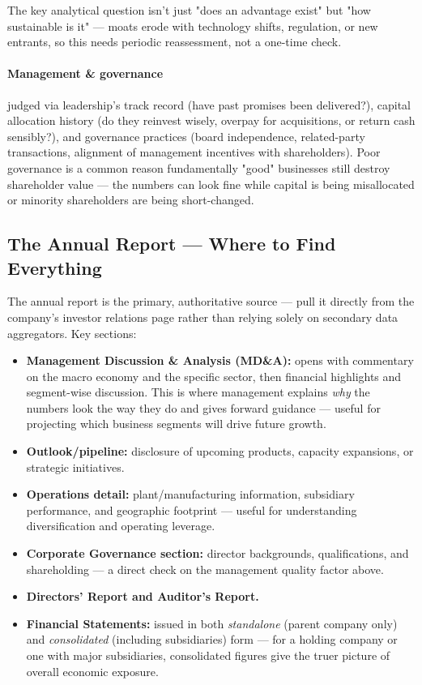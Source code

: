 \documentclass[12pt,openany]{book}
\begin{document}
The key analytical question isn't just "does an advantage exist" but "how sustainable is it" --- moats erode with technology shifts, regulation, or new entrants, so this needs periodic reassessment, not a one-time check.

\paragraph{Management \& governance} judged via leadership's track record (have past promises been delivered?), capital allocation history (do they reinvest wisely, overpay for acquisitions, or return cash sensibly?), and governance practices (board independence, related-party transactions, alignment of management incentives with shareholders). Poor governance is a common reason fundamentally "good" businesses still destroy shareholder value --- the numbers can look fine while capital is being misallocated or minority shareholders are being short-changed.

\subsection{The Annual Report --- Where to Find Everything}

The annual report is the primary, authoritative source --- pull it directly from the company's investor relations page rather than relying solely on secondary data aggregators. Key sections:

\begin{itemize}[leftmargin=*]
    \item \textbf{Management Discussion \& Analysis (MD\&A):} opens with commentary on the macro economy and the specific sector, then financial highlights and segment-wise discussion. This is where management explains \emph{why} the numbers look the way they do and gives forward guidance --- useful for projecting which business segments will drive future growth.
    \item \textbf{Outlook/pipeline:} disclosure of upcoming products, capacity expansions, or strategic initiatives.
    \item \textbf{Operations detail:} plant/manufacturing information, subsidiary performance, and geographic footprint --- useful for understanding diversification and operating leverage.
    \item \textbf{Corporate Governance section:} director backgrounds, qualifications, and shareholding --- a direct check on the management quality factor above.
    \item \textbf{Directors' Report and Auditor's Report.}
    \item \textbf{Financial Statements:} issued in both \emph{standalone} (parent company only) and \emph{consolidated} (including subsidiaries) form --- for a holding company or one with major subsidiaries, consolidated figures give the truer picture of overall economic exposure.
\end{itemize}
\end{document}
